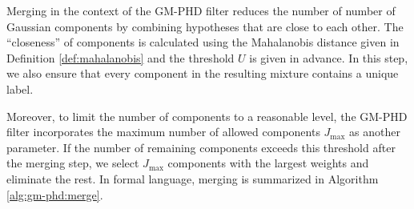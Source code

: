 Merging in the context of the GM-PHD filter reduces the number of number of Gaussian components by combining hypotheses that are close to each other. The ``closeness'' of components is calculated using the Mahalanobis distance given in Definition \ref{def:mahalanobis} and the threshold $U$ is given in advance. In this step, we also ensure that every component in the resulting mixture contains a unique label.

Moreover, to limit the number of components to a reasonable level, the GM-PHD filter incorporates the maximum number of allowed components $J_{\mathrm{max}}$ as another parameter. If the number of remaining components exceeds this threshold after the merging step, we select $J_{\mathrm{max}}$ components with the largest weights and eliminate the rest. In formal language, merging is summarized in Algorithm \ref{alg:gm-phd:merge}.

